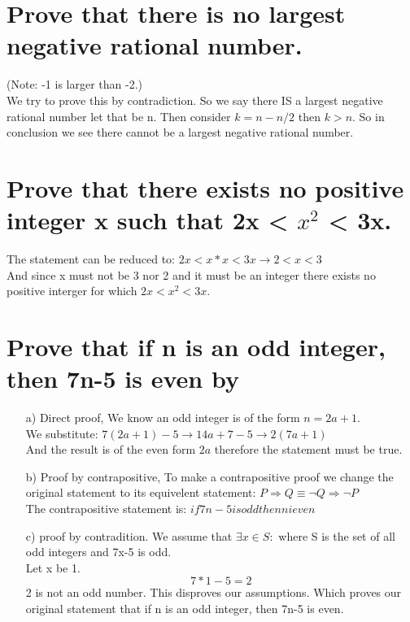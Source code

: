 \section{Prove that there is no largest negative rational number.}
(Note: -1 is larger than -2.)\\
We try to prove this by contradiction. So we say there IS a largest negative rational number let that be n.
Then consider $k=n-n/2$ then $k>n$. So in conclusion we see there cannot be a largest negative rational number.

\section{Prove that there exists no positive integer x such that 2x < $x^2$ < 3x.}
The statement can be reduced to: $2x<x*x<3x\rightarrow2<x<3$\\
And since x must not be 3 nor 2 and it must be an integer there exists no positive interger for which $2x<x^2<3x$.

\section{Prove that if n is an odd integer, then 7n-5 is even by}
\begin{itemize}
\item[a)] Direct proof,
We know an odd integer is of the form $n=2a+1$.\\
We substitute: $7(2a+1)-5\rightarrow14a+7-5\rightarrow2(7a+1)$\\
And the result is of the even form $2a$ therefore the statement must be true.
\item[b)] Proof by contrapositive,
To make a contrapositive proof we change the original statement to its equivelent statement: $P \Rightarrow Q \equiv \neg Q \Rightarrow \neg P$\\
The contrapositive statement is: $if 7n-5 is odd then n i even$\\

\item[c)] proof by contradition.
We assume that $\exists x \in S:$ where S is the set of all odd integers and 7x-5 is odd.\\
Let x be 1.
\begin{equation}
7*1-5 = 2
\end{equation}
2 is not an odd number.
This disproves our assumptions.
Which proves our original statement that if n is an odd integer, then 7n-5 is even.
\end{itemize}

